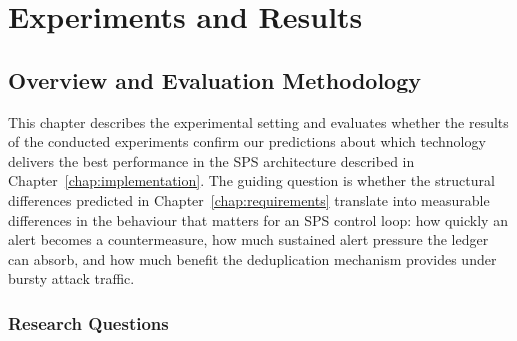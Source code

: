 
\chapter{Experiments and Results}
\label{chap:experiments}

\section{Overview and Evaluation Methodology}
\label{sec:exp_overview}

This chapter describes the experimental setting and evaluates whether the results of the conducted experiments confirm our predictions about which technology delivers the best performance in the SPS architecture described in Chapter~\ref{chap:implementation}. The guiding question is whether the structural differences predicted in Chapter~\ref{chap:requirements} translate into measurable differences in the behaviour that matters for an SPS control loop: how quickly an alert becomes a countermeasure, how much sustained alert pressure the ledger can absorb, and how much benefit the deduplication mechanism provides under bursty attack traffic.

\subsection{Research Questions}
\label{subsec:exp_rqs}

